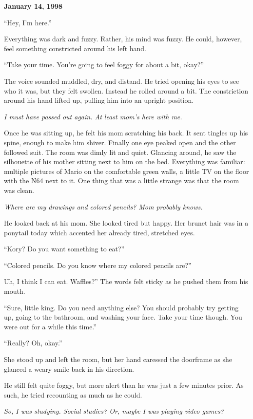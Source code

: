 \documentclass[9pt]{memoir}
\newcommand{\storydate}[1]{\noindent \textbf{#1} \vspace{2em}}
\begin{document}
\storydate{January 14, 1998}

``Hey, I'm here.''

Everything was dark and fuzzy. Rather, his mind was fuzzy. He could, however, feel something constricted around his left hand.

``Take your time. You're going to feel foggy for about a bit, okay?''

The voice sounded muddled, dry, and distand. He tried opening his eyes to see who it was, but they felt swollen. Instead he rolled around a bit. The constriction around his hand lifted up, pulling him into an upright position.

\textit{I must have passed out again. At least mom's here with me.}

Once he was sitting up, he felt his mom scratching his back. It sent tingles up his spine, enough to make him shiver. Finally one eye peaked open and the other followed suit. The room was dimly lit and quiet. Glancing around, he saw the silhouette of his mother sitting next to him on the bed. Everything was familiar: multiple pictures of Mario on the comfortable green walls, a little TV on the floor with the N64 next to it. One thing that was a little strange was that the room was clean.

\textit{Where are my drawings and colored pencils? Mom probably knows.}

He looked back at his mom. She looked tired but happy. Her brunet hair was in a ponytail today which accented her already tired, stretched eyes.

``Kory? Do you want something to eat?''

``Colored pencils. Do you know where my colored pencils are?''

Uh, I think I can eat. Waffles?'' The words felt sticky as he pushed them from his mouth.

``Sure, little king. Do you need anything else? You should probably try getting up, going to the bathroom, and washing your face. Take your time though. You were out for a while this time.''

``Really? Oh, okay.''

She stood up and left the room, but her hand caressed the doorframe as she glanced a weary smile back in his direction.

He still felt quite foggy, but more alert than he was just a few minutes prior. As such, he tried recounting as much as he could.

\textit{So, I was studying. Social studies? Or, maybe I was playing video games?}
\end{document}
